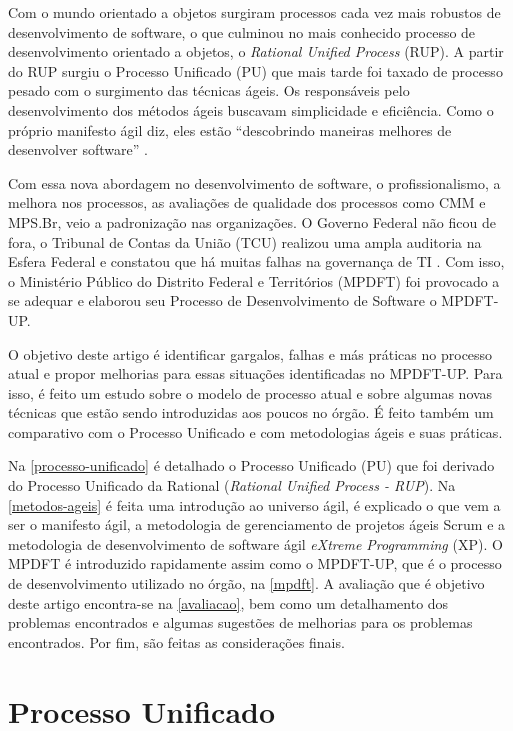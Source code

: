 \documentclass[
	article,			%
	11pt,				%
	oneside,			%
	a4paper,			%
	english,			%
	brazil,				%
	sumario=tradicional
	]{abntex2}
\begin{document}
Com o mundo orientado a objetos surgiram processos cada vez mais robustos de
desenvolvimento de software, o que culminou no mais conhecido processo de
desenvolvimento orientado a objetos, o \textit{Rational Unified Process} (RUP).
A partir do RUP surgiu o Processo Unificado (PU) que mais tarde foi taxado de
processo pesado com o surgimento das técnicas ágeis. Os responsáveis pelo
desenvolvimento dos métodos ágeis buscavam simplicidade e eficiência. Como o
próprio manifesto ágil diz, eles estão ``descobrindo maneiras melhores de
desenvolver software'' \cite{agilemanifesto}.

Com essa nova abordagem no desenvolvimento de software, o profissionalismo, a
melhora nos processos, as avaliações de qualidade dos processos como CMM e
MPS.Br, veio a padronização nas organizações. O Governo Federal não ficou de
fora, o Tribunal de Contas da União (TCU) realizou uma ampla auditoria na Esfera
Federal e constatou que há muitas falhas na governança de TI
\cite{dou-20080818}. Com isso, o Ministério Público do Distrito Federal e
Territórios (MPDFT) foi provocado a se adequar e elaborou seu Processo de
Desenvolvimento de Software o MPDFT-UP.

O objetivo deste artigo é identificar gargalos, falhas e más práticas no
processo atual e propor melhorias para essas situações identificadas no
MPDFT-UP. Para isso, é feito um estudo sobre o modelo de processo atual e sobre
algumas novas técnicas que estão sendo introduzidas aos poucos no órgão. É feito
também um comparativo com o Processo Unificado e com metodologias ágeis e suas
práticas.

Na \autoref{processo-unificado} é detalhado o Processo Unificado (PU) que foi
derivado do Processo Unificado da Rational (\textit{Rational Unified Process -
RUP}). Na \autoref{metodos-ageis} é feita uma introdução ao universo ágil, é
explicado o que vem a ser o manifesto ágil, a metodologia de gerenciamento de
projetos ágeis Scrum e a metodologia de desenvolvimento de software ágil
\textit{eXtreme Programming} (XP). O MPDFT é introduzido rapidamente assim como
o MPDFT-UP, que é o processo de desenvolvimento utilizado no órgão, na
\autoref{mpdft}. A avaliação que é objetivo deste artigo encontra-se na
\autoref{avaliacao}, bem como um detalhamento dos problemas encontrados e
algumas sugestões de melhorias para os problemas encontrados. Por fim, são
feitas as considerações finais.

\section{Processo Unificado}
\end{document}
